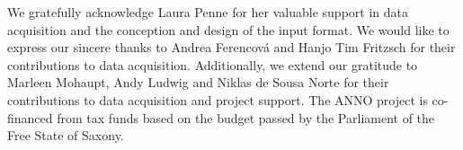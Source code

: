 \documentclass[sw]{iosart2x}
\begin{document}
\begin{ack}
\noindent\begin{minipage}{0.90\textwidth}
We gratefully acknowledge Laura Penne for her valuable support in data acquisition and the conception and design of the input format.
We would like to express our sincere thanks to Andrea Ferencová and Hanjo Tim Fritzsch for their contributions to data acquisition.
Additionally, we extend our gratitude to Marleen Mohaupt, Andy Ludwig and Niklas de Sousa Norte for their contributions to data acquisition and project support.
The ANNO project is co-financed from tax funds based on the budget passed by the Parliament of the Free State of Saxony.

\end{minipage}%
\hfill%
\begin{minipage}{0.04\textwidth}\raggedleft

\end{minipage}
\end{ack}
\end{document}

